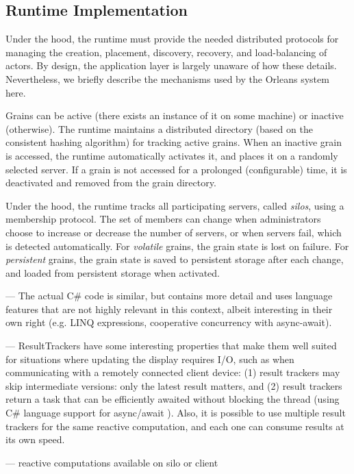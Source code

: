  
\hidden
{
\subsection{Runtime Implementation}

Under the hood, the runtime must provide the needed distributed protocols for managing the creation, placement, discovery, recovery, and load-balancing of actors. By design, the application layer is largely unaware of how these details. Nevertheless, we briefly describe the mechanisms used by the Orleans system here. 

 Grains can be active (there exists an instance of it on some machine) or inactive (otherwise). The runtime maintains a distributed directory (based on the consistent hashing algorithm)  for tracking active grains. When an inactive grain is accessed, the runtime automatically activates it, and places it on a randomly selected server. If a grain is not accessed for a prolonged (configurable) time, it is deactivated and removed from the grain directory. 

 Under the hood, the runtime tracks all participating servers, called \emph{silos}, using a membership protocol. The set of members can change when administrators choose to increase or decrease the number of servers, or when servers fail, which is detected automatically.  For \emph{volatile} grains, the grain state is lost on failure. For \emph{persistent} grains, the grain state is saved to persistent storage after each change, and loaded from persistent storage when activated. 
 

--- The actual C\# code is similar, but contains more detail and uses language features that are not highly relevant in this context, albeit interesting in their own right (e.g. LINQ expressions, cooperative concurrency with async-await).

--- ResultTrackers have some interesting properties that make them well suited for situations where updating the display requires I/O, such as when communicating with a remotely connected client device:   (1) result trackers may skip intermediate versions: only the latest result matters, and (2) result trackers return a task that can be efficiently awaited without blocking the thread (using C\# language support for async/await \cite{Bierman2012}).  Also, it is possible to use multiple result trackers for the same reactive computation, and each one can consume results at its own speed.

--- reactive computations available on silo or client
}

